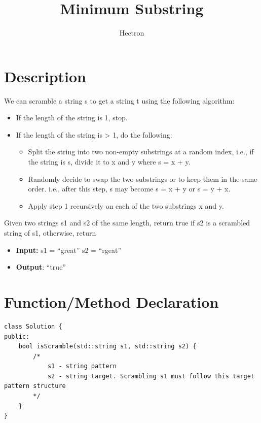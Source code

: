 \documentclass[a4paper,11pt]{article}
\author{Hectron}
\title{Minimum Substring}
\newcommand{\newpagex}{
    \newpage
    \vspace*{-7\baselineskip} %
}
\begin{document}
\maketitle

\tableofcontents

\newpagex
    \noindent

\section{Description}
    
We can scramble a string s to get a string t using the following algorithm:


    \begin{itemize}
        \item If the length of the string is 1, stop.
        \item  If the length of the string is > 1, do the following:
        \begin{itemize} 
            \item Split the string into two non-empty substrings at a random index, i.e., if the string is s, divide it to x and y where s = x + y.
            \item Randomly decide to swap the two substrings or to keep them in the same order. i.e., after this step, s may become s = x + y or s = y + x.
            \item Apply step 1 recursively on each of the two substrings x and y.
        \end{itemize}
    \end{itemize}
    Given two strings s1 and s2 of the same length, return true if s2 is a scrambled string of s1, otherwise, return 



    \begin{itemize}
    \item \textbf{Input:} \newline \textmd{s1 = ``great''} \newline \textmd{s2 = ``rgeat''}
    \item \textbf{Output}: \newline  \textmd{``true''}
    \end{itemize}

\section{Function/Method Declaration} 
\footnotesize
\begin{verbatim}
class Solution {
public:
    bool isScramble(std::string s1, std::string s2) {
        /*
            s1 - string pattern 
            s2 - string target. Scrambling s1 must follow this target pattern structure
        */
    }
}
\end{verbatim}
\end{document}

